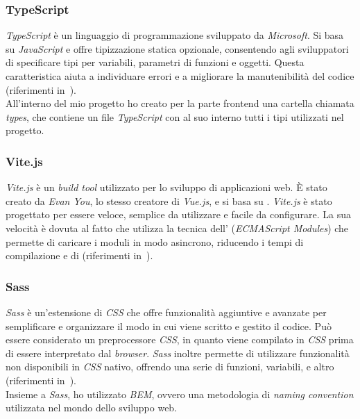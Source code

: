 \subsubsection{TypeScript}\label{subsubsec:typeScript}
\textit{TypeScript} è un linguaggio di programmazione  sviluppato da \textit{Microsoft}. Si basa su \textit{JavaScript} e offre tipizzazione statica opzionale, 
consentendo agli sviluppatori di specificare tipi per variabili, parametri di funzioni e oggetti. Questa caratteristica aiuta a individuare errori e a migliorare 
la manutenibilità del codice (riferimenti in~\cite{site:typescript}).\\
All'interno del mio progetto ho creato per la parte frontend una cartella chiamata \textit{types}, che contiene un file \textit{TypeScript} con al suo interno tutti i tipi utilizzati nel progetto.
\subsubsection{Vite.js}\label{subsubsec:vite}
\textit{Vite.js} è un \textit{build tool} utilizzato per lo sviluppo di applicazioni web. È stato creato da \textit{Evan You}, lo stesso creatore di \textit{Vue.js}, e si basa su .
\textit{Vite.js} è stato progettato per essere veloce, semplice da utilizzare e facile da configurare. La sua velocità è dovuta al fatto che utilizza la tecnica dell' (\textit{ECMAScript Modules})
che permette di caricare i moduli in modo asincrono, riducendo i tempi di compilazione e di  (riferimenti in~\cite{site:vite}).
\subsubsection{Sass}\label{subsubsec:sass}
\textit{Sass} è un'estensione di \textit{CSS} che offre funzionalità aggiuntive e avanzate per semplificare e organizzare il modo in cui viene scritto e gestito il codice.
Può essere considerato un preprocessore \textit{CSS}, in quanto viene compilato in \textit{CSS} prima di essere interpretato dal \textit{browser}. \textit{Sass} inoltre permette di utilizzare funzionalità non disponibili in \textit{CSS} nativo, offrendo una serie di funzioni, variabili,  e altro (riferimenti in~\cite{site:sass}).\\
Insieme a \textit{Sass}, ho utilizzato \textit{BEM}, ovvero una metodologia di \textit{naming convention} utilizzata nel mondo dello sviluppo web.

